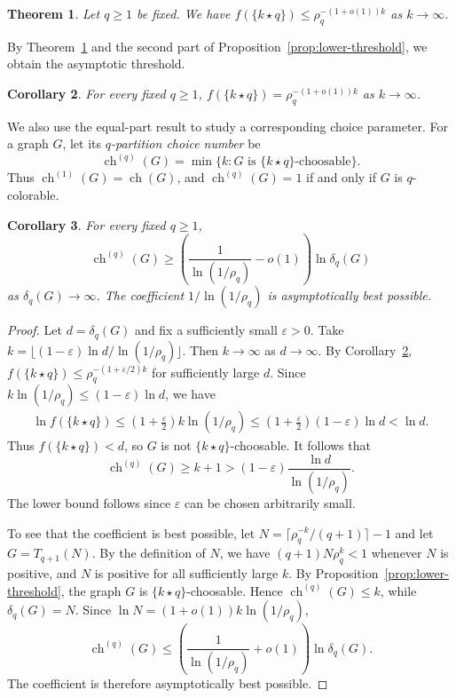 \documentclass[10pt,a4paper]{amsart}
\numberwithin{equation}{section}
\newtheorem{theorem}{Theorem}[section]
\newtheorem{corollary}[theorem]{Corollary}
\newcommand{\equalparts}[2]{\{#1\star #2\}}
\begin{document}
\begin{theorem}\label{thm:equal-upper}
Let $q\geq 1$ be fixed. We have
$f(\equalparts{k}{q}) \leq\rho_q^{-(1+o(1))k}$ as $k\to\infty$.
\end{theorem}

By Theorem~\ref{thm:equal-upper} and the second part of
Proposition~\ref{prop:lower-threshold}, we obtain the asymptotic threshold.

\begin{corollary}\label{cor:equal-threshold}
For every fixed $q\geq 1$, $f(\equalparts{k}{q})=\rho_q^{-(1+o(1))k}$ as $k\to\infty$. 
\end{corollary}

We also use the equal-part result to study a corresponding choice parameter.
For a graph $G$, let its \emph{$q$-partition choice number} be
\[
 \operatorname{ch}^{(q)}(G)
 =\min\{k:G\text{ is }\equalparts{k}{q}\text{-choosable}\}.
\]
Thus $\operatorname{ch}^{(1)}(G)=\operatorname{ch}(G)$, and
$\operatorname{ch}^{(q)}(G)=1$ if and only if $G$ is $q$-colorable.

\begin{corollary}\label{cor:partition-choice}
For every fixed $q\geq1$,
\[
 \operatorname{ch}^{(q)}(G)\geq
 \left(\frac{1}{\ln(1/\rho_q)}-o(1)\right)\ln\delta_q(G)
\]
as $\delta_q(G)\to\infty$. The coefficient
$1/\ln(1/\rho_q)$ is asymptotically best possible.
\end{corollary}

\begin{proof}
Let $d=\delta_q(G)$ and fix a sufficiently small $\varepsilon>0$. Take
$k=\lfloor(1-\varepsilon)\ln d/\ln(1/\rho_q)\rfloor$.
Then $k\to\infty$ as $d\to\infty$. By Corollary~\ref{cor:equal-threshold}, $f(\equalparts{k}{q})\leq \rho_q^{-(1+\varepsilon/2)k}$ for sufficiently large $d$.
Since $k\ln(1/\rho_q)\leq(1-\varepsilon)\ln d$, we have
\[
 \begin{aligned}
 \ln f(\equalparts{k}{q}) \leq \left(1+\frac{\varepsilon}{2}\right)
 k\ln(1/\rho_q) \leq \left(1+\frac{\varepsilon}{2}\right)
 (1-\varepsilon)\ln d
 <\ln d.
 \end{aligned}
\] 
Thus $f(\equalparts{k}{q})<d$, so $G$ is not
$\equalparts{k}{q}$-choosable. It follows that
\[
 \operatorname{ch}^{(q)}(G)\geq k+1
 >(1-\varepsilon)\frac{\ln d}{\ln(1/\rho_q)}.
\]
The lower bound follows since $\varepsilon$ can be chosen arbitrarily small.

To see that the coefficient is best possible, let
$N=\lceil\rho_q^{-k}/(q+1)\rceil-1$ and let $G=T_{q+1}(N)$.
By the definition of $N$, we have $(q+1)N\rho_q^k<1$ whenever $N$ is positive,
and $N$ is positive for all sufficiently large $k$.
By Proposition~\ref{prop:lower-threshold}, the graph $G$ is
$\equalparts{k}{q}$-choosable. Hence
$\operatorname{ch}^{(q)}(G)\leq k$, while $\delta_q(G)=N$. Since
$\ln N=(1+o(1))k\ln(1/\rho_q)$,
\[
 \operatorname{ch}^{(q)}(G)
 \leq\left(\frac{1}{\ln(1/\rho_q)}+o(1)\right)
 \ln\delta_q(G).
\]
The coefficient is therefore asymptotically best possible.
\end{proof}
\end{document}
